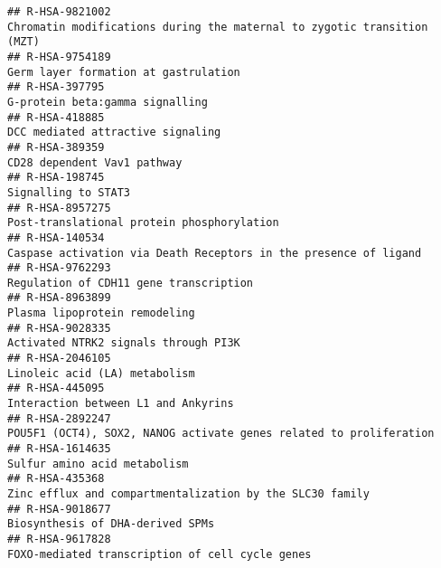\documentclass[
]{article}
\begin{document}
\begin{verbatim}
## R-HSA-9821002                                                              Chromatin modifications during the maternal to zygotic transition (MZT)
## R-HSA-9754189                                                                                                 Germ layer formation at gastrulation
## R-HSA-397795                                                                                                       G-protein beta:gamma signalling
## R-HSA-418885                                                                                                     DCC mediated attractive signaling
## R-HSA-389359                                                                                                           CD28 dependent Vav1 pathway
## R-HSA-198745                                                                                                                   Signalling to STAT3
## R-HSA-8957275                                                                                           Post-translational protein phosphorylation
## R-HSA-140534                                                                      Caspase activation via Death Receptors in the presence of ligand
## R-HSA-9762293                                                                                               Regulation of CDH11 gene transcription
## R-HSA-8963899                                                                                                        Plasma lipoprotein remodeling
## R-HSA-9028335                                                                                                 Activated NTRK2 signals through PI3K
## R-HSA-2046105                                                                                                        Linoleic acid (LA) metabolism
## R-HSA-445095                                                                                                   Interaction between L1 and Ankyrins
## R-HSA-2892247                                                                   POU5F1 (OCT4), SOX2, NANOG activate genes related to proliferation
## R-HSA-1614635                                                                                                         Sulfur amino acid metabolism
## R-HSA-435368                                                                              Zinc efflux and compartmentalization by the SLC30 family
## R-HSA-9018677                                                                                                     Biosynthesis of DHA-derived SPMs
## R-HSA-9617828                                                                                      FOXO-mediated transcription of cell cycle genes

\end{verbatim}
\end{document}
